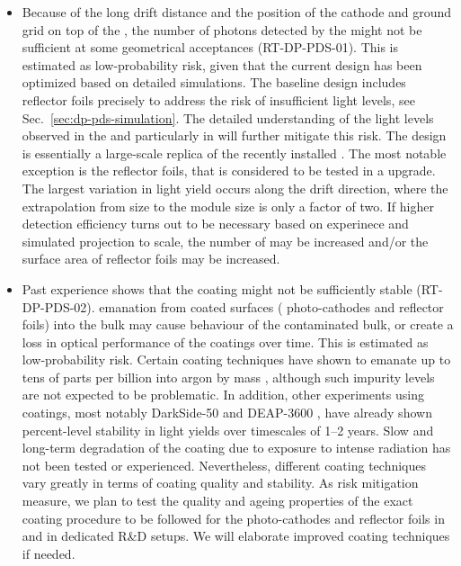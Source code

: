 \begin{itemize}

\item Because of the long drift distance and the position of the cathode and ground grid on top of the , the number of photons detected by the  might not be sufficient at some geometrical acceptances (RT-DP-PDS-01). This is estimated as low-probability risk, given that the current  design has been optimized based on detailed simulations. The  baseline design includes  reflector foils precisely to address the risk of insufficient light levels, see Sec.~\ref{sec:dp-pds-simulation}. The detailed understanding of the light levels observed in the  and particularly in  will further mitigate this risk. The \dune {}  design is essentially a large-scale replica of the recently installed  . The most notable exception is the  reflector foils, that is considered to be tested in a   upgrade. The largest variation in light yield occurs along the drift direction, where the extrapolation from  size to the \dune {} module size is only a factor of two. If higher  detection efficiency turns out to be necessary based on  experinece and simulated projection to \dune scale, the number of  may be increased and/or the surface area of  reflector foils may be increased.

\item Past experience shows that the  coating might not be sufficiently stable (RT-DP-PDS-02).  emanation from coated surfaces ( photo-cathodes and  reflector foils) into the bulk  may cause  behaviour of the contaminated  bulk, or create a loss in optical performance of the coatings over time. This is estimated as low-probability risk. Certain coating techniques have shown to emanate  up to tens of parts per billion into argon by mass \cite{Asaadi:2018ixs}, although such impurity levels are not expected to be problematic. In addition, other  experiments using  coatings, most notably DarkSide-50 \cite{Agnes:2018fwg} and DEAP-3600 \cite{Ajaj:2019imk}, have already shown percent-level stability in  light yields over timescales of 1--2 years. Slow and long-term degradation of the  coating due to exposure to intense  radiation has not been tested or experienced. Nevertheless, different coating techniques vary greatly in terms of coating quality and stability. As risk mitigation measure, we plan to test the quality and ageing properties of the exact coating procedure to be followed for the  photo-cathodes and  reflector foils in  and in dedicated R\&D setups. We will elaborate improved coating techniques if needed.


\end{itemize}

